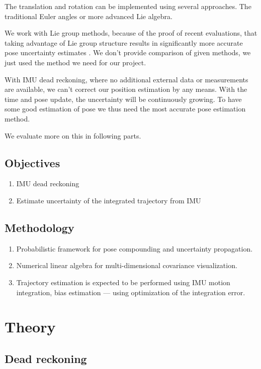 \documentclass{article}
\begin{document}
The translation and rotation can be implemented using several approaches. The traditional Euler angles or more advanced Lie algebra.    


We work with Lie group methods, because of the proof of recent evaluations, that taking advantage of Lie group structure results in significantly
more accurate pose uncertainty estimates \cite{Mangelson}.
We don't provide comparison of given methods, we just used the method we need for our project.

With IMU dead reckoning, where no additional external  data or measurements are available, we can't correct our position estimation by any means. With the time and pose update, the uncertainty will be continuously growing. To have some good estimation of pose we thus need the most accurate pose estimation method. 

We evaluate more on this in following parts.

\subsection{Objectives}
\begin{enumerate}
	\item IMU dead reckoning
	\item Estimate uncertainty of the integrated trajectory from IMU
\end{enumerate}

\subsection{Methodology}

\begin{enumerate}
	\item  Probabilistic framework for pose compounding and uncertainty propagation.
	\item Numerical linear algebra for multi-dimensional covariance visualization. 
	\item Trajectory estimation is expected to be performed using IMU motion integration, bias estimation — using optimization of the integration error.
\end{enumerate}


\section{Theory}

\subsection{Dead reckoning}
\end{document}
